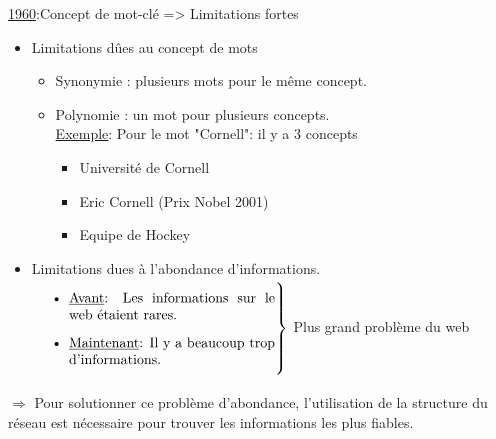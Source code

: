 \documentclass{article}
\begin{document}
\underline{1960}:Concept de mot-clé => Limitations fortes

\begin{itemize}
    \item Limitations dûes au concept de mots 
        \begin{itemize}
            \item Synonymie : plusieurs mots pour le même concept.
            \item Polynomie : un mot pour plusieurs concepts.\\
            \underline{Exemple}: Pour le mot "Cornell": il y a 3 concepts
                 \begin{itemize}
                    \item Université de Cornell
                    \item Eric Cornell (Prix Nobel 2001) 
                    \item Equipe de Hockey
                 \end{itemize}

        \end{itemize}
    \item Limitations dues à l'abondance d'informations. \\
    $\left. %
    \parbox{0.5\linewidth}{
        \begin{itemize}
            \item \underline{Avant}: Les informations sur le web étaient rares. 
            \item \underline{Maintenant}: Il y a beaucoup trop d'informations.
        \end{itemize}
        } \right 
        \}
        $ Plus grand problème du web
\end{itemize}
    
$\Rightarrow$ Pour solutionner ce problème d'abondance, l'utilisation de la structure du réseau est nécessaire pour trouver les informations les plus fiables.
\end{document}
